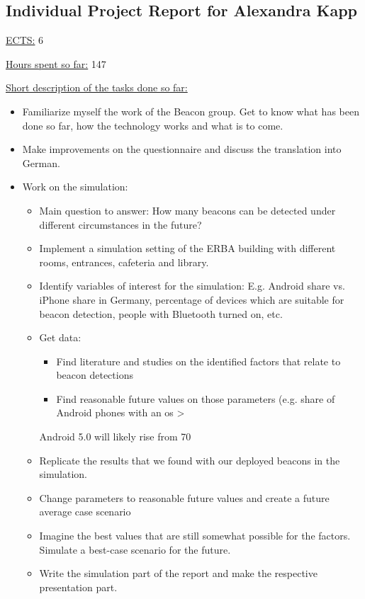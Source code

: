 \subsection{Individual Project Report for Alexandra Kapp}
\par \underline{ECTS:} 6
\par \underline{Hours spent so far:} 147 
\par \underline{Short description of the tasks done so far:}
\begin{itemize}
\item Familiarize myself the work of the Beacon group. Get to know what has been done so far, how the technology works and what is to come.
\item Make improvements on the questionnaire and discuss the translation into German.
\item Work on the simulation:
\begin{itemize} 
\item Main question to answer: How many beacons can be detected under different circumstances in the future?
\item Implement a simulation setting of the ERBA building with different rooms, entrances, cafeteria and library.
\item Identify variables of interest for the simulation: E.g. Android share vs. iPhone share in Germany, percentage of devices which are suitable for beacon detection, people with Bluetooth turned on, etc.
\item Get data:
\begin{itemize} 
\item Find literature and studies on the identified factors that relate to beacon detections
\item Find reasonable future values on those parameters (e.g. share of Android phones with an os > 
\end{itemize}
Android 5.0 will likely rise from 70%
\item Replicate the results that we found with our deployed beacons in the simulation.
\item Change parameters to reasonable future values and create a future average case scenario
\item Imagine the best values that are still somewhat possible for the factors. Simulate a best-case scenario for the future.
\item Write the simulation part of the report and make the respective presentation part. 
\end{itemize}
\end{itemize}



